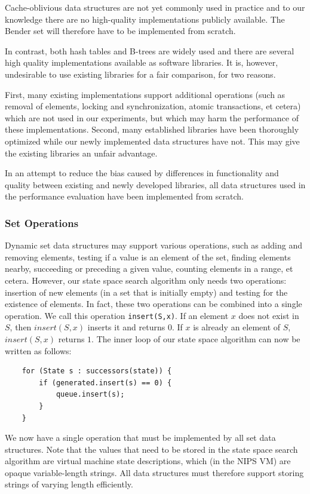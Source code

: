 \documentclass{acm_proc_article-sp}
\begin{document}
Cache-oblivious data structures are not yet commonly used in practice and to
our knowledge there are no high-quality implementations publicly available.
The Bender set will therefore have to be implemented from scratch.

In contrast, both hash tables and B-trees are widely used and there are several
high quality implementations available as software libraries. It is, however,
undesirable to use existing libraries for a fair comparison, for two reasons.

First, many existing implementations support additional operations (such as removal of elements, locking and synchronization, atomic transactions, et cetera) which are not used in our experiments, but which may harm the performance of these implementations. Second, many established libraries have been thoroughly optimized while our newly implemented data structures have not. This may give the existing libraries an unfair advantage.

In an attempt to reduce the bias caused by differences in functionality and
quality between existing and newly developed libraries, all data structures
used in the performance evaluation have been implemented from scratch.

\subsubsection{Set Operations}
Dynamic set data structures may support various operations, such as adding and removing elements, testing if a value is an element of the set, finding elements nearby, succeeding or preceding a given value, counting elements in a range, et cetera. However, our state space search algorithm only needs two operations: insertion of new elements (in a set that is initially empty) and testing for the existence of elements. In fact, these two operations can be combined into a single operation. We call this operation \verb#insert(S,x)#. If an element $x$ does not exist in $S$, then $insert(S,x)$ inserts it and returns $0$. If $x$ is already an element of $S$, $insert(S,x)$ returns $1$. The inner loop of our state space algorithm can now be written as follows:
\begin{verbatim}
    for (State s : successors(state)) {
        if (generated.insert(s) == 0) {
            queue.insert(s);
        }
    }
\end{verbatim}

We now have a single operation that must be implemented by all set data structures. Note that the values that need to be stored in the state space search algorithm are virtual machine state descriptions, which (in the NIPS VM) are opaque variable-length strings. All data structures must therefore support storing strings of varying length efficiently.
\end{document}
